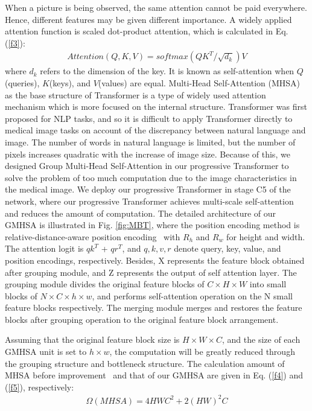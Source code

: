 \documentclass[journal]{IEEEtran}
\begin{document}
When a picture is being observed, the same attention cannot be paid everywhere. Hence, different features may be given different importance. A widely applied attention function is scaled dot-product attention, which is calculated in Eq. (\ref{f3}):
\begin{equation}
\begin{aligned}
Attention(Q,K,V)=softmax(QK^T/\sqrt{d_k})V 
\end{aligned}
\label{f3}
\end{equation}
where $d_k$ refers to the dimension of the key. It is known as self-attention when $Q$(queries), $K$(keys), and $V$(values) are equal.
Multi-Head Self-Attention (MHSA)\cite{vaswani2017attention} as the base structure of Transformer is a type of widely used attention mechanism which is more focused on the internal structure. 
Transformer was first proposed for NLP tasks, and so it is difficult to apply Transformer directly to medical image tasks on account of the discrepancy between natural language and image. The number of words in natural language is limited, but the number of pixels increases quadratic with the increase of image size. Because of this, we designed Group Multi-Head Self-Attention in our progressive Transformer to solve the problem of too much computation due to the image characteristics in the medical image. We deploy our progressive Transformer in stage C5 of the network, where our progressive Transformer achieves multi-scale self-attention and reduces the amount of computation. The detailed architecture of our GMHSA is illustrated in \textcolor[rgb]{0,0.541,0.855}{Fig. \ref{fig:MBT}}, where the position encoding method is relative-distance-aware position encoding~\cite{shaw2018self,ramachandran2019stand,Bello_2019_ICCV} with $R_{h}$ and $R_{w}$ for height and width. The attention logit is $qk^T$ + $qr^T$, and $q, k, v, r$ denote query, key, value, and position encodings, respectively. Besides, X represents the feature block obtained after grouping module, and Z represents the output of self attention layer. The grouping module divides the original feature blocks of $C \times H \times W$ into small blocks of $N \times C \times h \times w$, and performs self-attention operation on the N small feature blocks respectively. The merging module merges and restores the feature blocks after grouping operation to the original feature block arrangement.


Assuming that the original feature block size is $H \times W \times C$, and the size of each GMHSA unit is set to $h \times w$, the computation will be greatly reduced through the grouping structure and bottleneck structure. The calculation amount of MHSA before improvement~\cite{liu2021swin} and that of our GMHSA are given in Eq. (\ref{f4}) and (\ref{f5}), respectively:
\begin{equation}
\begin{aligned}
\Omega(MHSA) = 4HWC^2 + 2(HW)^2C
\end{aligned}
\label{f4}
\end{equation}
\end{document}
